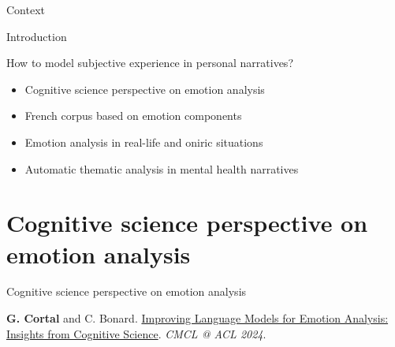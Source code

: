 \documentclass[handout,10pt]{beamer}
\begin{document}
\begin{frame}{Context}

\end{frame}


\begin{frame}{Introduction}

How to model subjective experience in personal narratives?



\vspace{0.25cm}
\pause

\begin{itemize}[<+->]
    \item Cognitive science perspective on emotion analysis
    \item French corpus based on emotion components
    \item Emotion analysis in real-life and oniric situations
    \item Automatic thematic analysis in mental health narratives %
\end{itemize}




    
\end{frame}

\section{Cognitive science perspective on emotion analysis}

\begin{frame}{}
    \vfill
    \begin{center}
        \Large Cognitive science perspective on emotion analysis
    \end{center}
    \vfill

    \footnotesize
    \textbf{G. Cortal} and C. Bonard. \href{https://aclanthology.org/2024.cmcl-1.23/}{Improving Language Models for Emotion Analysis: Insights from Cognitive Science}. \textit{CMCL @ ACL 2024}.
\end{frame}
\end{document}
